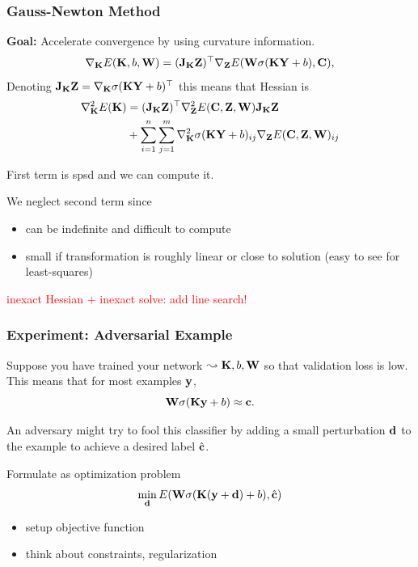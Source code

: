 \documentclass[12pt,fleqn,handout]{beamer}
\begin{document}
\begin{frame}
	\frametitle{Gauss-Newton Method}
	
	\textbf{Goal:} Accelerate convergence by using curvature information.
	$$
	\nabla_{{\bf K}} E({\bf K},b,{\bf W}) =  ({\bf J}_{\bf K} {\bf Z})^\top \nabla_{\bf Z} E({\bf W}\sigma({\bf K} {\bf Y}+b),{\bf C}),
	$$
	Denoting ${\bf J}_{\bf K} {\bf Z} = \nabla_{{\bf K}} \sigma({\bf K} {\bf Y}+b)^\top$ this means that Hessian is
	\begin{equation*}
		\begin{split}
	\nabla_{{\bf K}}^2 E({\bf K}) &  = ({\bf J}_{{\bf K}}{\bf Z})^\top  \nabla_{\bf Z}^2 E({\bf C},{\bf Z},{\bf W}) {\bf J}_{{\bf K}}{\bf Z}\\
	 & + \sum_{i=1}^{n}\sum_{j=1}^{m} \nabla_{{\bf K}}^2 \sigma({\bf K} {\bf Y}+b)_{ij} \nabla_{\bf Z} E({\bf C},{\bf Z},{\bf W})_{ij}
		\end{split}
	\end{equation*}
	
	First term is spsd and we can compute it.
	
	We neglect second term since
	\begin{itemize}
		\item can be indefinite and difficult to compute
		\item small if transformation is roughly linear or close to solution (easy to see for least-squares)
	\end{itemize}
	\begin{center}
		\textcolor{red}{inexact Hessian $+$ inexact solve: add line search!}
	\end{center}	
\end{frame}

\begin{frame}[fragile]
	\frametitle{Experiment: Adversarial Example}
	
	Suppose you have trained your network $\leadsto {\bf K}, b, {\bf W}$ so that validation loss is low. This means that for most examples ${\bf y}$, 
	$$
		{\bf W} \sigma({\bf K} {\bf y} + b) \approx {\bf c}.
	$$
	
	An adversary might try to fool this classifier by adding a small perturbation ${\bf d}$ to the example to achieve a desired label $\hat{{\bf c}}$. 
	
	\bigskip
	
	Formulate as optimization problem
	$$
		\min_{{\bf d}} E({\bf W} \sigma({\bf K} ({\bf y} + {\bf d}) + b), \hat{{\bf c}})
	$$
	\begin{itemize}
		\item setup objective function
		\item think about constraints, regularization
	\end{itemize}
\end{frame}
\end{document}
